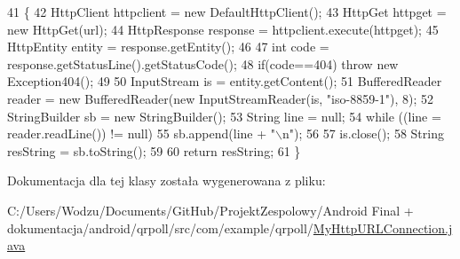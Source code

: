 \begin{DoxyCode}
41                                                                                                   \{
42         HttpClient httpclient = \textcolor{keyword}{new} DefaultHttpClient(); 
43         HttpGet httpget = \textcolor{keyword}{new} HttpGet(url); 
44         HttpResponse response = httpclient.execute(httpget); 
45         HttpEntity entity = response.getEntity(); 
46         
47         \textcolor{keywordtype}{int} code = response.getStatusLine().getStatusCode();
48         \textcolor{keywordflow}{if}(code==404) \textcolor{keywordflow}{throw} \textcolor{keyword}{new} Exception404(); 
49     
50         InputStream is = entity.getContent(); 
51         BufferedReader reader = \textcolor{keyword}{new} BufferedReader(\textcolor{keyword}{new} InputStreamReader(is, \textcolor{stringliteral}{"iso-8859-1"}), 8);
52         StringBuilder sb = \textcolor{keyword}{new} StringBuilder();
53         String line = null;
54         \textcolor{keywordflow}{while} ((line = reader.readLine()) != null) 
55             sb.append(line + \textcolor{stringliteral}{"\(\backslash\)n"});
56         
57         is.close(); 
58         String resString = sb.toString(); 
59         
60         \textcolor{keywordflow}{return} resString;   
61     \}
\end{DoxyCode}


Dokumentacja dla tej klasy została wygenerowana z pliku\+:\begin{DoxyCompactItemize}
\item 
C\+:/\+Users/\+Wodzu/\+Documents/\+Git\+Hub/\+Projekt\+Zespolowy/\+Android Final + dokumentacja/android/qrpoll/src/com/example/qrpoll/\hyperlink{_my_http_u_r_l_connection_8java}{My\+Http\+U\+R\+L\+Connection.\+java}\end{DoxyCompactItemize}
